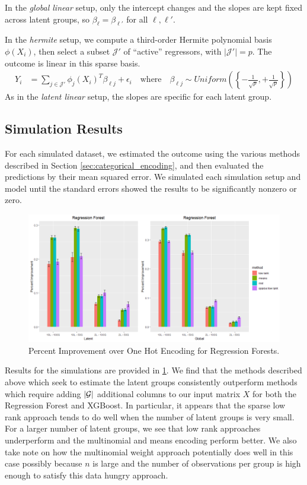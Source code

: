 \documentclass{article}
\theoremstyle{plain}
\theoremstyle{definition}
\theoremstyle{remark}
\begin{document}
In the \emph{global linear} setup, only the intercept changes and the slopes are kept fixed across latent groups, so $\beta_{\ell} = \beta_{\ell'}$ for all $\ell, \ell'$.

In the  \emph{hermite} setup, we compute a third-order Hermite polynomial basis $\phi(X_{i})$, then select a subset $\mathcal{J}'$ of ``active'' regressors, with $|\mathcal{J}'| = p$. The outcome is linear in this sparse basis.
\begin{align}
  Y_{i} &= \sum_{j \in \mathcal{J'}} \phi_{j}(X_{i})^{T}\beta_{\ell j} + \epsilon_{i}
  \quad \text{where} \quad
  \beta_{\ell j} \sim Uniform\left(\left\{-\frac{1}{\sqrt{p}}, +\frac{1}{\sqrt{p}}\right\}\right) \label{eq:hermite_outcome}
\end{align}
As in the \emph{latent linear} setup, the slopes are specific for each latent group.



\subsection{Simulation Results}
\label{sec:simulation_results}

For each simulated dataset, we estimated the outcome using the various methods described in Section \ref{sec:categorical_encoding}, and then evaluated the predictions by their mean squared error. We simulated each simulation setup and model until the standard errors showed the results to be significantly nonzero or zero. 


\begin{figure}[htbp]
	\centering
	\includegraphics[width=\linewidth]{figures/rf_sims_output.png}
	\caption {Percent Improvement over One Hot Encoding for Regression Forests.}
	\label{tab:rf_sim_setups}
\end{figure}

Results for the simulations are provided in \ref{tab:rf_sim_setups}. We find that the methods described above which seek to estimate the latent groups consistently outperform methods which require adding $|\mathcal{G}|$ additional columns to our input matrix $X$ for both the Regression Forest and XGBoost. In particular, it appears that the sparse low rank approach tends to do well when the number of latent groups is very small. For a larger number of latent groups, we see that low rank approaches underperform and the multinomial and means encoding perform better. We also take note on how the multinomial weight approach potentially does well in this case possibly because $n$ is large and the number of observations per group is high enough to satisfy this data hungry approach. 
\end{document}
